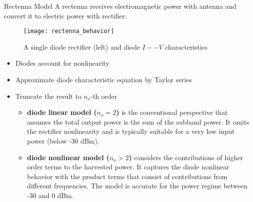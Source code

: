 \documentclass[xcolor={table}]{beamer}
\begin{document}
\begin{frame}[fragile=singleslide,t]
\begin{columns}[onlytextwidth,T]
\begin{column}{.47\textwidth}
\begin{block}{Rectenna Model}
A rectenna receives electromagnetic power with antenna and convert it to electric power with rectifier.
\begin{figure}
  \centering
    \texttt{[image: rectenna\_behavior]}
  \caption{A single diode rectifier (left) and diode $I -- V$ characteristics \cite{Clerckx2019}}
  \label{fig:rectenna_circuit}
\end{figure}
\begin{itemize}
  \item Diodes account for nonlinearity
  \item Approximate diode characteristic equation by Taylor series
  \item Truncate the result to ${n_o}$-th order
  \begin{itemize}
    \item \textbf{diode linear model (${n_o} = 2$)} is the conventional perspective that assumes the total output power is the sum of the subband power. It omits the rectifier nonlinearity and is typically suitable for a very low input power (below -30 dBm).
    \item \textbf{diode nonlinear model (${n_o} > 2$)} considers the contributions of higher order terms to the harvested power. It captures the diode nonlinear behavior with the product terms that consist of contributions from different frequencies. The model is accurate for the power regime between -30 and 0 dBm.
  \end{itemize}
\end{itemize}
\end{block}



\end{column}
\end{columns}
\end{frame}
\end{document}
